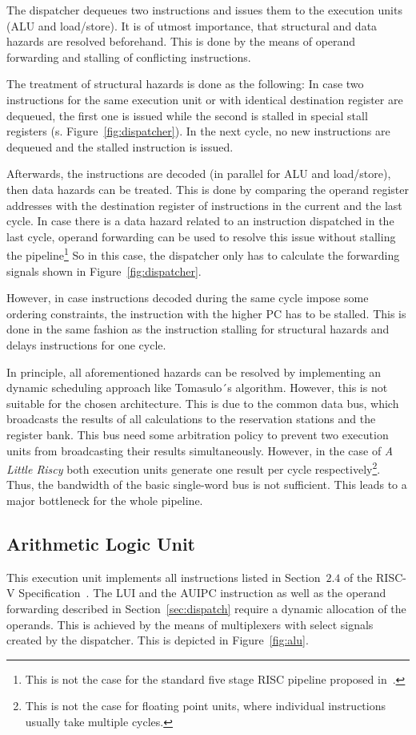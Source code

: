 \documentclass[conference]{IEEEtran}
\begin{document}
The dispatcher dequeues two instructions and issues them to the execution units (ALU and load/store). It is of utmost importance, that structural and data hazards are resolved beforehand. This is done by the means of operand forwarding and stalling of conflicting instructions.

The treatment of structural hazards is done as the following: In case two instructions for the same execution unit or with identical destination register are dequeued, the first one is issued while the second is stalled in special stall registers (s. Figure~\ref{fig:dispatcher}). In the next cycle, no new instructions are dequeued and the stalled instruction is issued.

Afterwards, the instructions are decoded (in parallel for ALU and load/store), then data hazards can be treated. This is done by comparing the operand register addresses with the destination register of instructions in the current and the last cycle. In case there is a data hazard related to an instruction dispatched in the last cycle, operand forwarding can be used to resolve this issue without stalling the pipeline\footnote{This is not the case for the standard five stage RISC pipeline proposed in~\cite{HP}.} So in this case, the dispatcher only has to calculate the forwarding signals shown in Figure~\ref{fig:dispatcher}.

However, in case instructions decoded during the same cycle impose some ordering constraints, the instruction with the higher PC has to be stalled. This is done in the same fashion as the instruction stalling for structural hazards and delays instructions for one cycle.

In principle, all aforementioned hazards can be resolved by implementing an dynamic scheduling approach like Tomasulo´s algorithm. However, this is not suitable for the chosen architecture. This is due to the common data bus, which broadcasts the results of all calculations to the reservation stations and the register bank. This bus need some arbitration policy to prevent two execution units from broadcasting their results simultaneously. However, in the case of \emph{A Little Riscy} both execution units generate one result per cycle respectively\footnote{This is not the case for floating point units, where individual instructions usually take multiple cycles.}. Thus, the bandwidth of the basic single-word bus is not sufficient. This leads to a major bottleneck for the whole pipeline.

\subsection{Arithmetic Logic Unit}
This execution unit implements all instructions listed in Section~$2.4$ of the RISC-V Specification~\cite{risc-v}. The LUI and the AUIPC instruction as well as the operand forwarding described in Section~\ref{sec:dispatch} require a dynamic allocation of the operands. This is achieved by the means of multiplexers with select signals created by the dispatcher. This is depicted in Figure~\ref{fig:alu}.
\end{document}

